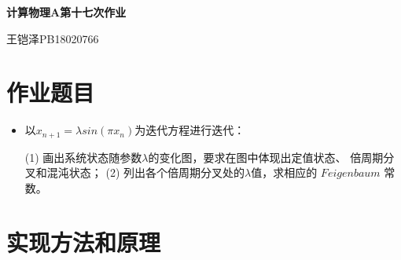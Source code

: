 \documentclass[UTF8]{ctexart}
\begin{document}
	\centering\textbf{\LARGE{计算物理A第十七次作业}}
	
	
	王铠泽\qquad PB18020766
	
		
	\section{作业题目}
	
	\begin{itemize}
		\item 以$x_{n+1}=\lambda sin(\pi x_n)$为迭代方程进行迭代：
		
		\subitem (1) 画出系统状态随参数$\lambda$的变化图，要求在图中体现出定值状态、
		倍周期分叉和混沌状态；
		\subitem (2) 列出各个倍周期分叉处的$\lambda$值，求相应的 $Feigenbaum$ 常数。
	\end{itemize}
	
	
	\section{实现方法和原理}
	
\end{document}
